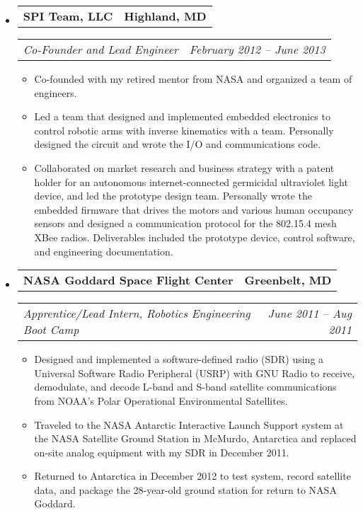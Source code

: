 \documentclass[10pt,letterpaper]{article}
\makeatletter
\newcommand{\headerrow}[2]
{\begin{tabular*}{\linewidth}{l@{\extracolsep{\fill}}r}
	#1 & #2 \\
\end{tabular*}}
\makeatother
\begin{document}
\begin{itemize}
	\item
	\headerrow
		{\textbf{SPI Team, LLC}}
		{\textbf{Highland, MD}}
	\headerrow
		{\emph{Co-Founder and Lead Engineer}}
		{\emph{February 2012 -- June 2013}}
	\begin{itemize}
        \item Co-founded with my retired mentor from NASA and organized a team
            of engineers.

        \item Led a team that designed and implemented embedded electronics to
            control robotic arms with inverse kinematics with a team.
            Personally designed the circuit and wrote the I/O and
            communications code.

        \item Collaborated on market research and business strategy with a
            patent holder for an autonomous internet-connected germicidal
            ultraviolet light device, and led the prototype design team.
            Personally wrote the embedded firmware that drives the motors and
            various human occupancy sensors and designed a communication
            protocol for the 802.15.4 mesh XBee radios.  Deliverables included
            the prototype device, control software, and engineering
            documentation.
	\end{itemize}

	\item
	\headerrow
		{\textbf{NASA Goddard Space Flight Center}}
		{\textbf{Greenbelt, MD}}
	\headerrow
		{\emph{Apprentice/Lead Intern, Robotics Engineering Boot Camp}}
		{\emph{June 2011 -- Aug 2011}}
	\begin{itemize}
        \item Designed and implemented a software-defined radio (SDR) using a
            Universal Software Radio Peripheral (USRP) with GNU Radio to
            receive, demodulate, and decode L-band and S-band satellite
            communications from NOAA's Polar Operational Environmental
            Satellites.

        \item Traveled to the NASA Antarctic Interactive Launch Support
            system at the NASA Satellite Ground Station in McMurdo, Antarctica
            and replaced on-site analog equipment with my SDR in December 2011.

        \item Returned to Antarctica in December 2012 to test system, record
            satellite data, and package the 28-year-old ground station for
            return to NASA Goddard.
	\end{itemize}


\end{itemize}
\end{document}
